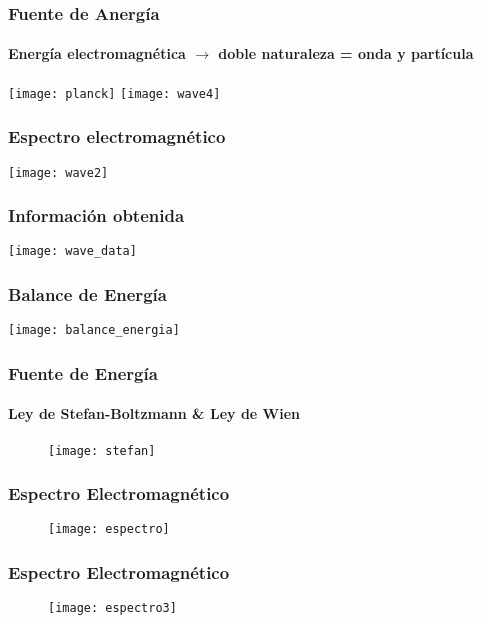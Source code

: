 \documentclass[]{beamer}
\begin{document}
\begin{frame}
\frametitle{Fuente de Anergía}
\framesubtitle{Energía electromagnética $\rightarrow$ doble naturaleza = onda y partícula}
\begin{center}
\texttt{[image: planck]}
\texttt{[image: wave4]}
\end{center}
\end{frame}
\begin{frame}
\frametitle{Espectro electromagnético}
\begin{center}
\texttt{[image: wave2]}
\end{center}
\end{frame}
\begin{frame}
\frametitle{Información obtenida}
\begin{center}
\texttt{[image: wave\_data]}
\end{center}
\end{frame}
\begin{frame}
\frametitle{Balance de Energía}
\begin{center}
\texttt{[image: balance\_energia]}
\end{center}
\end{frame}
\begin{frame}
\frametitle{Fuente de Energía}
\framesubtitle{Ley de Stefan-Boltzmann \& Ley de Wien}
  \begin{figure}
    \centering
    \texttt{[image: stefan]}
  \end{figure}
\end{frame}
\begin{frame}
\frametitle{Espectro Electromagnético}
  \begin{figure}
    \centering
    \texttt{[image: espectro]}
  \end{figure}
\end{frame}
\begin{frame}
\frametitle{Espectro Electromagnético}
  \begin{figure}
    \centering
    \texttt{[image: espectro3]}
  \end{figure}
\end{frame}
\end{document}
